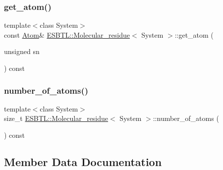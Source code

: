 \subsubsection{\texorpdfstring{get\+\_\+atom()}{get\_atom()}}
{\footnotesize\ttfamily template$<$class System$>$ \\
const \hyperlink{classESBTL_1_1Molecular__residue_ac48ca38f130266b0403df294bff016ae}{Atom}\& \hyperlink{classESBTL_1_1Molecular__residue}{E\+S\+B\+T\+L\+::\+Molecular\+\_\+residue}$<$ System $>$\+::get\+\_\+atom (\begin{DoxyParamCaption}\item[{unsigned}]{sn }\end{DoxyParamCaption}) const\hspace{0.3cm}{\ttfamily [inline]}}

\mbox{\label{classESBTL_1_1Molecular__residue_a98e2ece965924adef88f8509bd77177c}} 
\subsubsection{\texorpdfstring{number\+\_\+of\+\_\+atoms()}{number\_of\_atoms()}}
{\footnotesize\ttfamily template$<$class System$>$ \\
size\+\_\+t \hyperlink{classESBTL_1_1Molecular__residue}{E\+S\+B\+T\+L\+::\+Molecular\+\_\+residue}$<$ System $>$\+::number\+\_\+of\+\_\+atoms (\begin{DoxyParamCaption}{ }\end{DoxyParamCaption}) const\hspace{0.3cm}{\ttfamily [inline]}}



\subsection{Member Data Documentation}
\mbox{\label{classESBTL_1_1Molecular__residue_a91a04d48586a8e07c80837e9e871183b}} 
